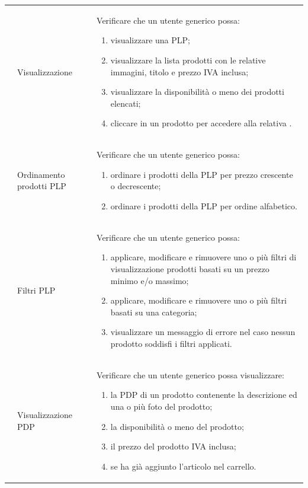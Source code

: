 \begin{center}
\begin{longtable}{|p{1cm}|p{4.85cm}|p{9cm}|}
	 & Visualizzazione \glock{PLP} & Verificare che un utente generico possa: 
	\begin{enumerate}
		\item  visualizzare una PLP;
		\item  visualizzare la lista prodotti con le relative immagini, titolo e prezzo IVA inclusa;
		\item  visualizzare la disponibilità o meno dei prodotti elencati;
		\item  cliccare in un prodotto per accedere alla relativa \glock{PDP}.
	\end{enumerate} \\

	 & Ordinamento prodotti PLP & Verificare che un utente generico possa: 
	\begin{enumerate}
		\item  ordinare i prodotti della PLP per prezzo crescente o decrescente;
		\item  ordinare i prodotti della PLP per ordine alfabetico.
	\end{enumerate} \\

	 & Filtri PLP & Verificare che un utente generico possa: 
	\begin{enumerate}
		\item  applicare, modificare e rimuovere uno o più filtri di visualizzazione prodotti basati su un prezzo minimo e/o massimo;
		\item  applicare, modificare e rimuovere uno o più filtri basati su una categoria;
		\item  visualizzare un messaggio di errore nel caso nessun prodotto soddisfi i filtri applicati.
	\end{enumerate} \\

	 & Visualizzazione PDP & Verificare che un utente generico possa visualizzare: 
	\begin{enumerate}
		\item   la PDP di un prodotto contenente la descrizione ed una o più foto del prodotto;
		\item   la disponibilità o meno del prodotto;
		\item   il prezzo del prodotto IVA inclusa;
		\item   se ha già aggiunto l'articolo nel carrello.
	\end{enumerate} \\


\end{longtable}
\end{center}
